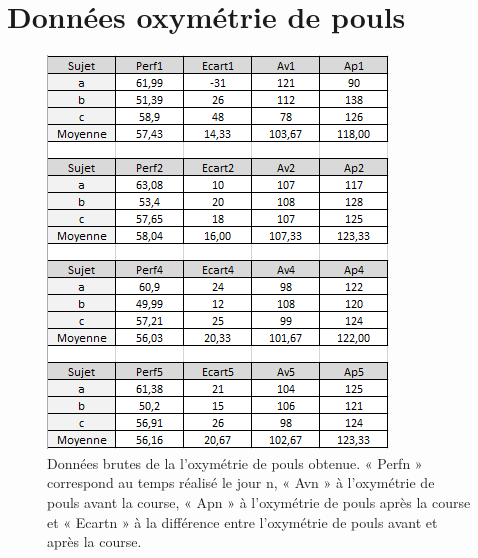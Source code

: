 \documentclass[oneside,12pt, numbered]{book}
\begin{document}
    \frontmatter
   
        
        
        
        
        

        \newpage
        
        \listoffigures

        
        
        
        
    
    \mainmatter
  
        
        
        
        
        

        \appendix  \label{annexe}
        

          \chapter{Données oxymétrie de pouls}
        \label{annexe_oxy}
        
        \begin{figure}[H]
            \centering
            \includegraphics[scale=1.5]{images/donnees_fc}
            \caption{\label{fig:donnees_fc}Données brutes de la l'oxymétrie de pouls obtenue. « Perfn » correspond au temps réalisé le jour n, « Avn » à l'oxymétrie de pouls avant la course, « Apn » à l'oxymétrie de pouls après la course et « Ecartn » à la différence entre l'oxymétrie de pouls avant et après la course.}
        \end{figure}
\end{document}
